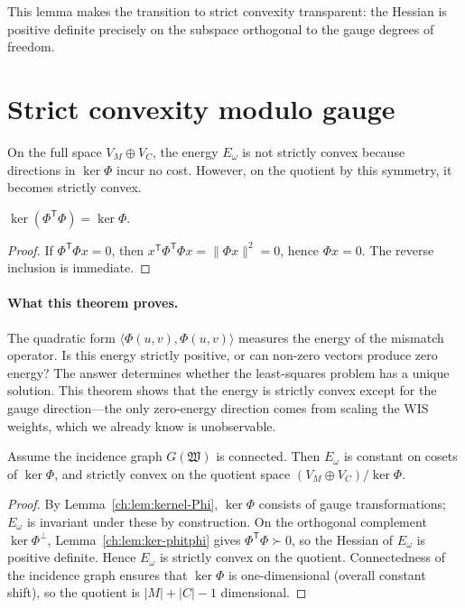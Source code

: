 This lemma makes the transition to strict convexity transparent: the
Hessian is positive definite precisely on the subspace orthogonal to
the gauge degrees of freedom.
\section{Strict convexity modulo gauge}\label{ch:sec:strict-convexity-modulo-gauge}
On the full space $V_M\oplus V_C$, the energy $E_\omega$ is not strictly convex because directions in $\ker\Phi$ incur no cost.  However, on the quotient by this symmetry, it becomes strictly convex.
\begin{lemma}\label{ch:lem:ker-phitphi}
$\ker(\Phi^{\mathsf T}\Phi)=\ker\Phi$.
\end{lemma}
\begin{proof}
If $\Phi^{\mathsf T}\Phi x=0$, then $x^{\mathsf T}\Phi^{\mathsf T}\Phi x=\|\Phi x\|^2=0$, hence $\Phi x=0$.  The reverse inclusion is immediate.
\end{proof}

\paragraph{What this theorem proves.}
The quadratic form $\langle \Phi(u,v),\Phi(u,v)\rangle$ measures the energy of the mismatch operator.  Is this energy strictly positive, or can non-zero vectors produce zero energy?  The answer determines whether the least-squares problem has a unique solution.  This theorem shows that the energy is strictly convex except for the gauge direction---the only zero-energy direction comes from scaling the WIS weights, which we already know is unobservable.

\begin{theorem}\label{ch:thm:strict-convexity}
Assume the incidence graph $G(\mathfrak W)$ is connected.  Then $E_\omega$ is constant on cosets of $\ker\Phi$, and strictly convex on the quotient space $(V_M\oplus V_C)/\ker\Phi$.
\end{theorem}
\begin{proof}
By Lemma~\ref{ch:lem:kernel-Phi}, $\ker\Phi$ consists of gauge transformations; $E_\omega$ is invariant under these by construction.  On the orthogonal complement $\ker\Phi^\perp$, Lemma~\ref{ch:lem:ker-phitphi} gives $\Phi^{\mathsf T}\Phi\succ 0$, so the Hessian of $E_\omega$ is positive definite.  Hence $E_\omega$ is strictly convex on the quotient.  Connectedness of the incidence graph ensures that $\ker\Phi$ is one-dimensional (overall constant shift), so the quotient is $|M|+|C|-1$ dimensional.
\end{proof}

